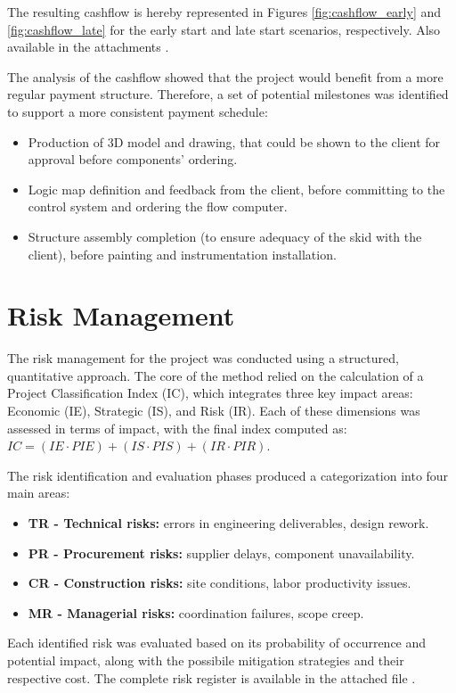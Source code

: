 The resulting cashflow is hereby represented in Figures \ref{fig:cashflow_early} and \ref{fig:cashflow_late} for the early start and late start scenarios, respectively. Also available in the attachments \cite{CashFlow1, CashFlow2}.

The analysis of the cashflow showed that the project would benefit from a more regular payment structure. Therefore, a set of potential milestones was identified to support a more consistent payment schedule:
\begin{itemize}
    \item Production of 3D model and drawing, that could be shown to the client for approval before components' ordering.
    \item Logic map definition and feedback from the client, before committing to the control system and ordering the flow computer.
    \item Structure assembly completion (to ensure adequacy of the skid with the client), before painting and instrumentation installation.
\end{itemize}

\section{Risk Management}

The risk management for the project was conducted using a structured, quantitative approach. The core of the method relied on the calculation of a Project Classification Index (IC), which integrates three key impact areas: Economic (IE), Strategic (IS), and Risk (IR). Each of these dimensions was assessed in terms of impact, with the final index computed as:
$IC = (IE \cdot PIE) + (IS \cdot PIS) + (IR \cdot PIR)$.

The risk identification and evaluation phases produced a categorization into four main areas:
\begin{itemize}
    \item \textbf{TR - Technical risks:} errors in engineering deliverables, design rework.
    \item \textbf{PR - Procurement risks:} supplier delays, component unavailability.
    \item \textbf{CR - Construction risks:} site conditions, labor productivity issues.
    \item \textbf{MR - Managerial risks:} coordination failures, scope creep.
\end{itemize}

Each identified risk was evaluated based on its probability of occurrence and potential impact, along with the possibile mitigation strategies and their respective cost.
The complete risk register is available in the attached file \cite{RiskRegister}.

